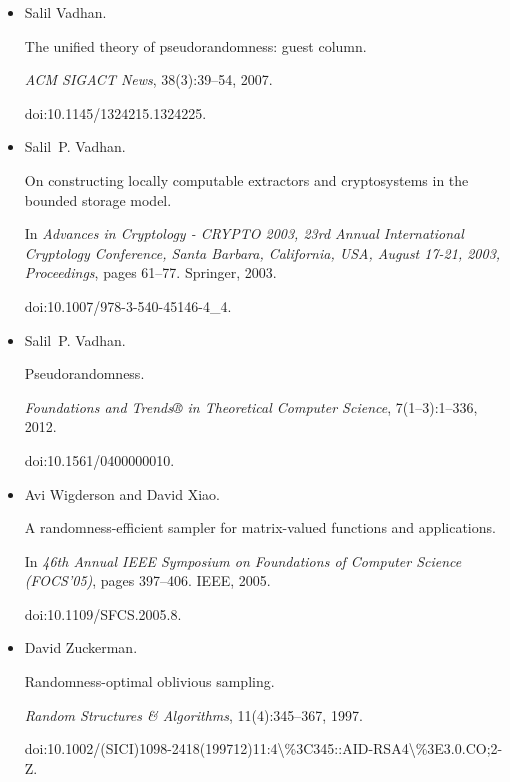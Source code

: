 \begin{itemize}
\item[] 
[39]

Salil Vadhan.


The unified theory of pseudorandomness: guest column.


\emph{ACM SIGACT News}, 38(3):39–54, 2007.


doi:10.1145/1324215.1324225.





\item[] 
[40]

Salil P. Vadhan.


On constructing locally computable extractors and cryptosystems in
the bounded storage model.


In \emph{Advances in Cryptology - CRYPTO 2003, 23rd Annual
International Cryptology Conference, Santa Barbara, California, USA, August
17-21, 2003, Proceedings}, pages 61–77. Springer, 2003.


doi:10.1007/978-3-540-45146-4\_4.





\item[] 
[41]

Salil P. Vadhan.


Pseudorandomness.


\emph{Foundations and Trends® in Theoretical Computer
Science}, 7(1–3):1–336, 2012.


doi:10.1561/0400000010.





\item[] 
[42]

Avi Wigderson and David Xiao.


A randomness-efficient sampler for matrix-valued functions and
applications.


In \emph{46th Annual IEEE Symposium on Foundations of Computer Science
(FOCS’05)}, pages 397–406. IEEE, 2005.


doi:10.1109/SFCS.2005.8.





\item[] 
[43]

David Zuckerman.


Randomness-optimal oblivious sampling.


\emph{Random Structures \& Algorithms}, 11(4):345–367, 1997.


doi:10.1002/(SICI)1098-2418(199712)11:4\textbackslash{}\%3C345::AID-RSA4\textbackslash{}\%3E3.0.CO;2-Z.






\end{itemize}
